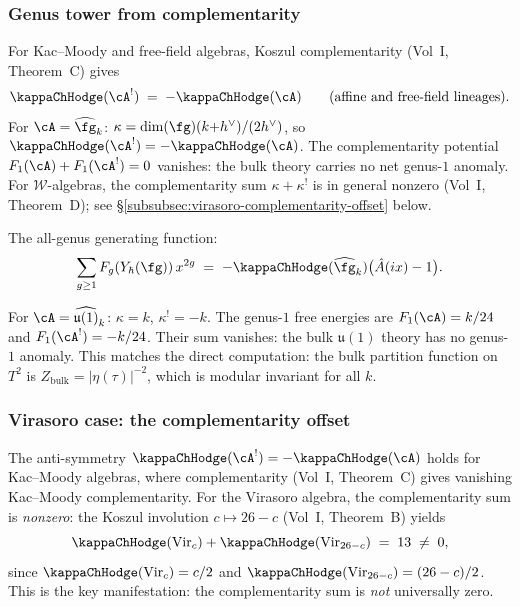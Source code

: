 \subsubsection*{Genus tower from complementarity}

For Kac--Moody and free-field algebras, Koszul complementarity (Vol~I, Theorem~C) gives
\begin{equation}\label{eq:yangian-kappa}
\kappaChHodge(\cA^!)
\;=\;
-\kappaChHodge(\cA)
\qquad\text{(affine and free-field lineages)}.
\end{equation}
For $\cA = \widehat{\fg}_k$:
$\kappa = \dim(\fg)(k{+}h^\vee)/(2h^\vee)$, so
$\kappaChHodge(\cA^!) = -\kappaChHodge(\cA)$. The complementarity
potential $F_1(\cA) + F_1(\cA^!) = 0$ vanishes: the bulk
theory carries no net genus-$1$ anomaly.
For $\mathcal{W}$-algebras, the complementarity sum
$\kappa + \kappa^!$ is in general nonzero
(Vol~I, Theorem~D); see \S\ref{subsubsec:virasoro-complementarity-offset} below.

The all-genus generating function:
\[
\sum_{g \ge 1} F_g(Y_\hbar(\fg))\,x^{2g}
\;=\;
-\kappaChHodge(\widehat{\fg}_k)\bigl(\hat{A}(ix) - 1\bigr).
\]

\begin{computation}
\label{comp:heisenberg-genus}
For $\cA = \widehat{\mathfrak{u}(1)}_k$:
$\kappa = k$, $\kappa^! = -k$. The genus-$1$ free energies
are $F_1(\cA) = k/24$ and $F_1(\cA^!) = -k/24$. Their sum
vanishes: the bulk $\mathfrak{u}(1)$ theory has no
genus-$1$ anomaly. This matches the direct computation:
the bulk partition function on $T^2$ is
$Z_{\mathrm{bulk}} = |\eta(\tau)|^{-2}$, which is modular
invariant for all $k$.
\end{computation}

\subsubsection*{Virasoro case: the complementarity offset}

The anti-symmetry $\kappaChHodge(\cA^!) = -\kappaChHodge(\cA)$ holds for
Kac--Moody algebras, where complementarity (Vol~I, Theorem~C)
gives vanishing Kac--Moody complementarity. For the Virasoro algebra, the
complementarity sum is \emph{nonzero}: the Koszul involution
$c \mapsto 26 - c$ (Vol~I, Theorem~B) yields
\begin{equation}\label{eq:virasoro-complementarity-offset}
\kappaChHodge(\mathrm{Vir}_c) + \kappaChHodge(\mathrm{Vir}_{26-c})
\;=\; 13
\;\neq\; 0,
\end{equation}
since $\kappaChHodge(\mathrm{Vir}_c) = c/2$ and
$\kappaChHodge(\mathrm{Vir}_{26-c}) = (26-c)/2$. This is the
key manifestation: the complementarity sum is
\emph{not} universally zero.

